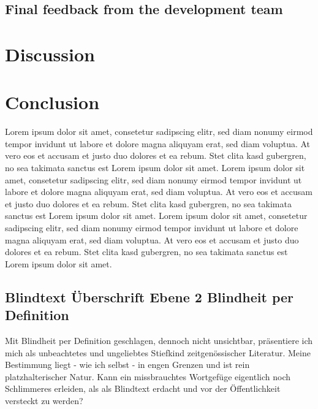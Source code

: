 \documentclass[
	english,
	ruledheaders=section,%
	class=report,%
	thesis={type=bachelor},%
	accentcolor=1b,%
	custommargins=true,%
	marginpar=false,%
	parskip=half-,%
	fontsize=11pt,%
	DIV=14,
]{tudapub}
\begin{document}
\section{Final feedback from the development team}

\chapter{Discussion}

\chapter{Conclusion}
Lorem ipsum dolor sit amet, consetetur sadipscing elitr, sed diam nonumy eirmod tempor invidunt ut labore et dolore magna aliquyam erat, sed diam voluptua. At vero eos et accusam et justo duo dolores et ea rebum. Stet clita kasd gubergren, no sea takimata sanctus est Lorem ipsum dolor sit amet. Lorem ipsum dolor sit amet, consetetur sadipscing elitr, sed diam nonumy eirmod tempor invidunt ut labore et dolore magna aliquyam erat, sed diam voluptua. At vero eos et accusam et justo duo dolores et ea rebum. Stet clita kasd gubergren, no sea takimata sanctus est Lorem ipsum dolor sit amet. Lorem ipsum dolor sit amet, consetetur sadipscing elitr, sed diam nonumy eirmod tempor invidunt ut labore et dolore magna aliquyam erat, sed diam voluptua. At vero eos et accusam et justo duo dolores et ea rebum. Stet clita kasd gubergren, no sea takimata sanctus est Lorem ipsum dolor sit amet.
\section{Blindtext Überschrift Ebene 2 Blindheit per Definition}
Mit Blindheit per Definition geschlagen, dennoch nicht unsichtbar, präsentiere ich mich als unbeachtetes und ungeliebtes Stiefkind zeitgenössischer Literatur. Meine Bestimmung liegt - wie ich selbst - in engen Grenzen und ist rein platzhalterischer Natur. Kann ein missbrauchtes Wortgefüge eigentlich noch Schlimmeres erleiden, als als Blindtext erdacht und vor der Öffentlichkeit versteckt zu werden?
\end{document}
